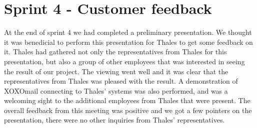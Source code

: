 \section{Sprint 4 - Customer feedback}
At the end of sprint 4 we had completed a preliminary presentation. We thought it was benedicial to perform this presentation for Thales to get some feedback on it. Thales had gathered not only the representatives from Thales for this presentation, but also a group of other employees that was interested in seeing the result of our project. The viewing went well and it was clear that the representatives from Thales was pleased with the result. A demonstration of XOXOmail connecting to Thales' systems was also performed, and was a welcoming sight to the additional employees from Thales that were present. 
\newline
\newline
The overall feedback from this meeting was positive and we got a few pointers on the presentation, there were no other inquiries from Thales' representatives.
